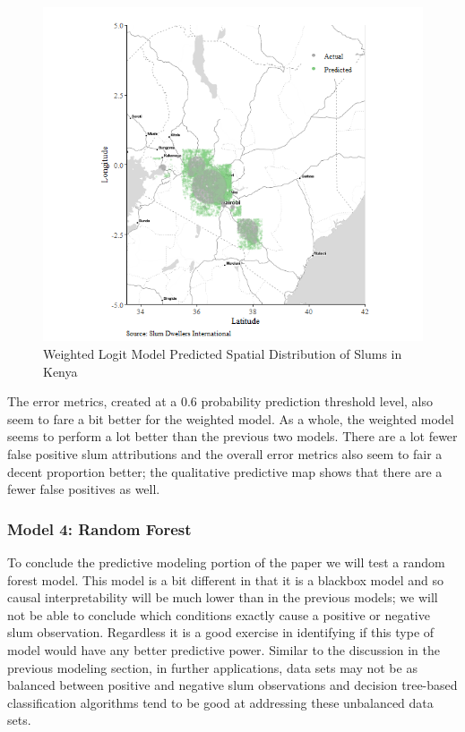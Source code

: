 \begin{figure}
    \centering
    \includegraphics[scale = 0.6]{Graphics/Weighted Predicted Spatial Distribution of Slums in Kenya.png}
    \caption{Weighted Logit Model Predicted Spatial Distribution of Slums in Kenya}
    \label{fig:weightedPredict}
\end{figure}
The error metrics, created at a 0.6 probability prediction threshold level, also seem to fare a bit better for the weighted model. As a whole, the weighted model seems to perform a lot better than the previous two models. There are a lot fewer false positive slum attributions and the overall error metrics also seem to fair a decent proportion better; the qualitative predictive map shows that there are a fewer false positives as well.

\subsubsection{Model 4: Random Forest}

To conclude the predictive modeling portion of the paper we will test a random forest model. This model is a bit different in that it is a blackbox model and so causal interpretability will be much lower than in the previous models; we will not be able to conclude which conditions exactly cause a positive or negative slum observation. Regardless it is a good exercise in identifying if this type of model would have any better predictive power. Similar to the discussion in the previous modeling section, in further applications, data sets may not be as balanced between positive and negative slum observations and decision tree-based classification algorithms tend to be good at addressing these unbalanced data sets.

